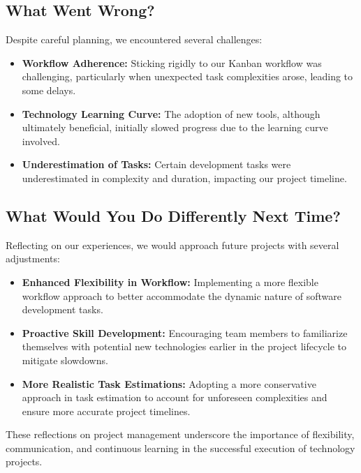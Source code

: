 \documentclass{article}
\begin{document}
\subsection{What Went Wrong?}

Despite careful planning, we encountered several challenges:

\begin{itemize}
    \item \textbf{Workflow Adherence:} Sticking rigidly to our Kanban workflow was challenging, particularly when unexpected task complexities arose, leading to some delays.
    \item \textbf{Technology Learning Curve:} The adoption of new tools, although ultimately beneficial, initially slowed progress due to the learning curve involved.
    \item \textbf{Underestimation of Tasks:} Certain development tasks were underestimated in complexity and duration, impacting our project timeline.
\end{itemize}

\subsection{What Would You Do Differently Next Time?}

Reflecting on our experiences, we would approach future projects with several adjustments:

\begin{itemize}
    \item \textbf{Enhanced Flexibility in Workflow:} Implementing a more flexible workflow approach to better accommodate the dynamic nature of software development tasks.
    \item \textbf{Proactive Skill Development:} Encouraging team members to familiarize themselves with potential new technologies earlier in the project lifecycle to mitigate slowdowns.
    \item \textbf{More Realistic Task Estimations:} Adopting a more conservative approach in task estimation to account for unforeseen complexities and ensure more accurate project timelines.
\end{itemize}

These reflections on project management underscore the importance of flexibility, communication, and continuous learning in the successful execution of technology projects.
\end{document}
